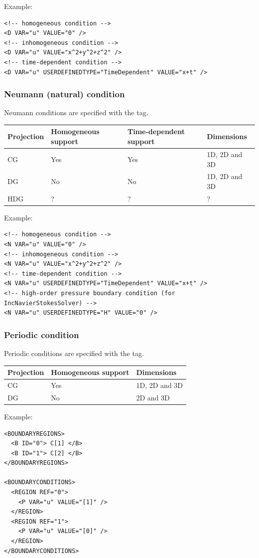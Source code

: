 Example:
\begin{lstlisting}[style=XMLStyle]
<!-- homogeneous condition -->
<D VAR="u" VALUE="0" />
<!-- inhomogeneous condition -->
<D VAR="u" VALUE="x^2+y^2+z^2" />
<!-- time-dependent condition -->
<D VAR="u" USERDEFINEDTYPE="TimeDependent" VALUE="x+t" />
\end{lstlisting}

\subsubsection{Neumann (natural) condition}
Neumann conditions are specified with the  tag.

\begin{tabular}{llll}
Projection & Homogeneous support & Time-dependent support & Dimensions \\
\toprule
CG & Yes & Yes & 1D, 2D and 3D \\
DG & No  & No  & 1D, 2D and 3D \\
HDG & ? & ? & ?
\end{tabular}

Example:
\begin{lstlisting}[style=XMLStyle]
<!-- homogeneous condition -->
<N VAR="u" VALUE="0" />
<!-- inhomogeneous condition -->
<N VAR="u" VALUE="x^2+y^2+z^2" />
<!-- time-dependent condition -->
<N VAR="u" USERDEFINEDTYPE="TimeDependent" VALUE="x+t" />
<!-- high-order pressure boundary condition (for IncNavierStokesSolver) -->
<N VAR="u" USERDEFINEDTYPE="H" VALUE="0" />
\end{lstlisting}

\subsubsection{Periodic condition}\label{sec:periodicBC}
Periodic conditions are specified with the  tag.

\begin{tabular}{lll}
Projection & Homogeneous support & Dimensions \\
\toprule
CG  & Yes & 1D, 2D and 3D \\
DG  & No  & 2D and 3D
\end{tabular}

Example:
\begin{lstlisting}[style=XMLStyle]
<BOUNDARYREGIONS>
  <B ID="0"> C[1] </B>
  <B ID="1"> C[2] </B>
</BOUNDARYREGIONS>

<BOUNDARYCONDITIONS>
  <REGION REF="0">
    <P VAR="u" VALUE="[1]" />
  </REGION>
  <REGION REF="1">
    <P VAR="u" VALUE="[0]" />
  </REGION>
</BOUNDARYCONDITIONS>
\end{lstlisting}

